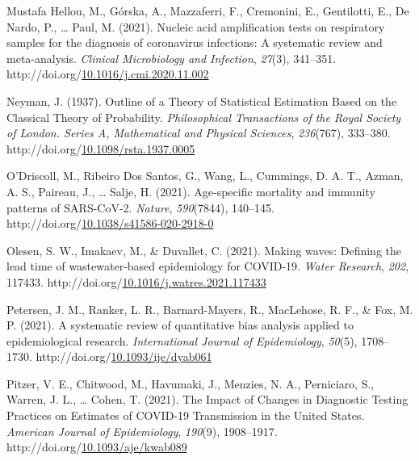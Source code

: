 \documentclass[12pt,twoside]{smiththesis}
\newlength{\cslhangindent}
\newenvironment{CSLReferences}[2] %
 {%
\setlength{\parindent}{0pt}
\ifodd #1 \everypar{\setlength{\hangindent}{\cslhangindent}}\ignorespaces\fi
\ifnum #2 > 0
\setlength{\parskip}{#2\baselineskip}
  \fi
}%
{}
\begin{document}
\begin{CSLReferences}{1}{0}
\leavevmode{}%
Mustafa Hellou, M., Górska, A., Mazzaferri, F., Cremonini, E., Gentilotti, E., De Nardo, P., \ldots{} Paul, M. (2021). Nucleic acid amplification tests on respiratory samples for the diagnosis of coronavirus infections: A systematic review and meta-analysis. \emph{Clinical Microbiology and Infection}, \emph{27}(3), 341--351. http://doi.org/\href{https://doi.org/10.1016/j.cmi.2020.11.002}{10.1016/j.cmi.2020.11.002}

\leavevmode{}%
Neyman, J. (1937). Outline of a {Theory} of {Statistical Estimation Based} on the {Classical Theory} of {Probability}. \emph{Philosophical Transactions of the Royal Society of London. Series A, Mathematical and Physical Sciences}, \emph{236}(767), 333--380. http://doi.org/\href{https://doi.org/10.1098/rsta.1937.0005}{10.1098/rsta.1937.0005}

\leavevmode{}%
O'Driscoll, M., Ribeiro Dos Santos, G., Wang, L., Cummings, D. A. T., Azman, A. S., Paireau, J., \ldots{} Salje, H. (2021). Age-specific mortality and immunity patterns of {SARS-CoV-2}. \emph{Nature}, \emph{590}(7844), 140--145. http://doi.org/\href{https://doi.org/10.1038/s41586-020-2918-0}{10.1038/s41586-020-2918-0}

\leavevmode{}%
Olesen, S. W., Imakaev, M., \& Duvallet, C. (2021). Making waves: {Defining} the lead time of wastewater-based epidemiology for {COVID-19}. \emph{Water Research}, \emph{202}, 117433. http://doi.org/\href{https://doi.org/10.1016/j.watres.2021.117433}{10.1016/j.watres.2021.117433}

\leavevmode{}%
Petersen, J. M., Ranker, L. R., Barnard-Mayers, R., MacLehose, R. F., \& Fox, M. P. (2021). A systematic review of quantitative bias analysis applied to epidemiological research. \emph{International Journal of Epidemiology}, \emph{50}(5), 1708--1730. http://doi.org/\href{https://doi.org/10.1093/ije/dyab061}{10.1093/ije/dyab061}

\leavevmode{}%
Pitzer, V. E., Chitwood, M., Havumaki, J., Menzies, N. A., Perniciaro, S., Warren, J. L., \ldots{} Cohen, T. (2021). The {Impact} of {Changes} in {Diagnostic Testing Practices} on {Estimates} of {COVID-19 Transmission} in the {United States}. \emph{American Journal of Epidemiology}, \emph{190}(9), 1908--1917. http://doi.org/\href{https://doi.org/10.1093/aje/kwab089}{10.1093/aje/kwab089}


\end{CSLReferences}
\end{document}
